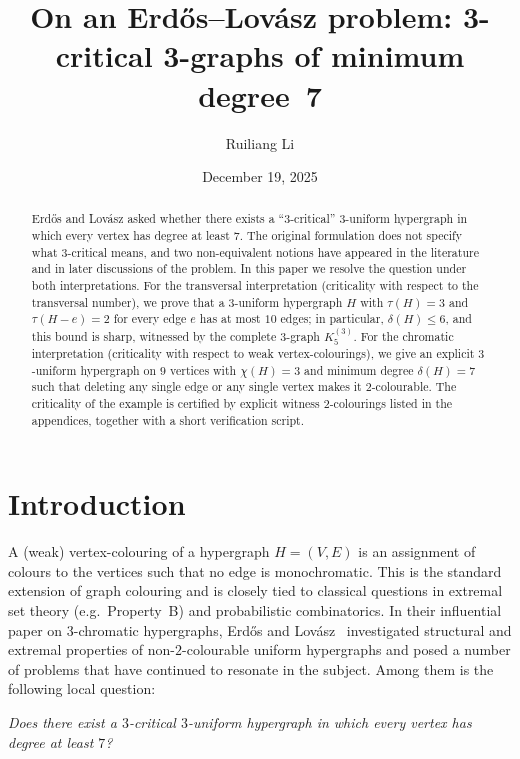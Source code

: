 \documentclass[11pt]{amsart}
\title[3-critical 3-graphs of minimum degree 7]{On an Erd\H{o}s--Lov\'asz problem: 3-critical 3-graphs of minimum degree~7}
\author{Ruiliang Li}
\date{December 19, 2025}
\theoremstyle{definition}
\theoremstyle{remark}
\newcommand{\V}{V}
\newcommand{\E}{E}
\newcommand{\del}{\delta}
\begin{document}
\begin{abstract}
Erd\H{o}s and Lov\'asz asked whether there exists a ``$3$-critical'' $3$-uniform hypergraph in which every vertex has degree at least $7$.
The original formulation does not specify what $3$-critical means, and two non-equivalent notions have appeared in the literature and in later discussions of the problem.
In this paper we resolve the question under both interpretations.
For the transversal interpretation (criticality with respect to the transversal number), we prove that a $3$-uniform hypergraph $H$ with $\tau(H)=3$ and $\tau(H-e)=2$ for every edge $e$ has at most $10$ edges; in particular, $\del(H)\le 6$, and this bound is sharp, witnessed by the complete $3$-graph $K^{(3)}_5$.
For the chromatic interpretation (criticality with respect to weak vertex-colourings), we give an explicit $3$-uniform hypergraph on $9$ vertices with $\chi(H)=3$ and minimum degree $\del(H)=7$ such that deleting any single edge or any single vertex makes it $2$-colourable.
The criticality of the example is certified by explicit witness $2$-colourings listed in the appendices, together with a short verification script.
\end{abstract}

\maketitle

\section{Introduction}\label{sec:intro}

A (weak) vertex-colouring of a hypergraph $H=(\V,\E)$ is an assignment of colours to the vertices such that no edge is monochromatic.
This is the standard extension of graph colouring and is closely tied to classical questions in extremal set theory (e.g.\ Property~B) and probabilistic combinatorics.
In their influential paper on $3$-chromatic hypergraphs, Erd\H{o}s and Lov\'asz~\cite{ErdosLovasz1975} investigated structural and extremal properties of non-$2$-colourable uniform hypergraphs and posed a number of problems that have continued to resonate in the subject.
Among them is the following local question:

\medskip
\noindent\emph{Does there exist a $3$-critical $3$-uniform hypergraph in which every vertex has degree at least $7$?}
\medskip
\end{document}

